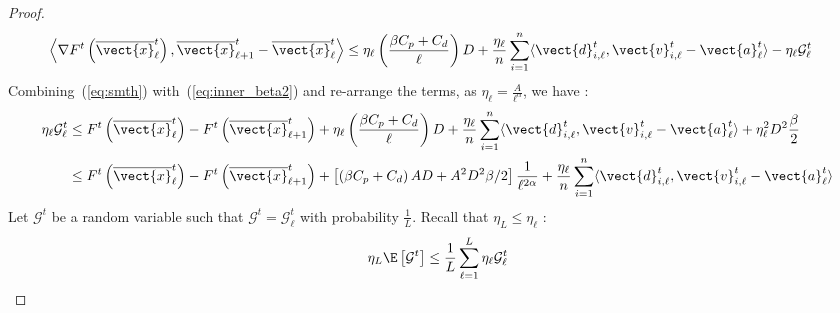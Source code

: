\begin{proof}
\begin{equation}
\label{eq:inner_beta2}
    \begin{aligned}
        \left \langle \nabla F^{t} \left( \overline{\vect{x}}^t_{\ell} \right), \overline{\vect{x}}^t_{\ell+1} - \overline{\vect{x}}^t_{\ell} \right \rangle
        & \leq \eta_{\ell}\left( \frac{\beta C_p + C_d}{\ell}\right)D + \frac{\eta_{\ell}}{n} \sum_{i=1}^{n}\langle \vect{d}^t_{i,\ell}, \vect{v}^t_{i,\ell} - \vect{a}^t_{\ell} \rangle - \eta_{\ell}\mathcal{G}^t_{\ell} 
    \end{aligned}
\end{equation}  Combining~(\ref{eq:smth}) with~(\ref{eq:inner_beta2}) and re-arrange the terms, as $\eta_{\ell} = \frac{A}{\ell^{\alpha}}$, we have : 
\begin{equation}
\label{eq:eta_gap_ell}
    \begin{aligned}
         \eta_{\ell} \mathcal{G}^t_{\ell} 
        & \leq F^{t} \left( \overline{\vect{x}}^t_{\ell} \right) - F^{t} \left( \overline{\vect{x}}^t_{\ell+1} \right) 
        + \eta_{\ell}\left( \frac{\beta C_p + C_d}{\ell}\right)D + \frac{\eta_{\ell}}{n} \sum_{i=1}^{n}\langle \vect{d}^t_{i,\ell}, \vect{v}^t_{i,\ell} - \vect{a}^t_{\ell} \rangle + \eta^2_{\ell}D^2 \frac{\beta}{2} \\
        & \leq F^{t} \left( \overline{\vect{x}}^t_{\ell} \right) - F^{t} \left( \overline{\vect{x}}^t_{\ell+1} \right)
        + \left[ \left( \beta C_p + C_d \right)AD + A^2 D^2 \beta/2 \right] \frac{1}{\ell^{2\alpha}} + \frac{\eta_{\ell}}{n} \sum_{i=1}^{n}\langle \vect{d}^t_{i,\ell}, \vect{v}^t_{i,\ell} - \vect{a}^t_{\ell} \rangle 
    \end{aligned}
\end{equation}  Let $\mathcal{G}^t$ be a random variable such that $\mathcal{G}^t = \mathcal{G}^t_{\ell}$ with probability $\frac{1}{L}$. Recall that $\eta_{L} \leq \eta_{\ell}$ : 
\begin{equation}
    \begin{aligned}
        \eta_{L} \E \left[ \mathcal{G}^t \right] \leq 
        \frac{1}{L}\sum_{\ell=1}^L\eta_{\ell}\mathcal{G}^t_{\ell}

\end{aligned}
\end{equation}
\end{proof}
